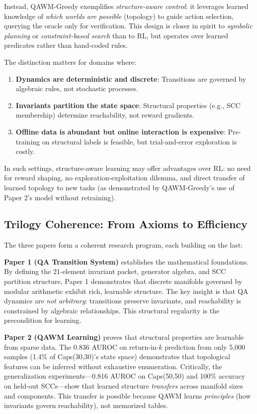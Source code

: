 Instead, QAWM-Greedy exemplifies \textit{structure-aware control}: it leverages learned knowledge of \textit{which worlds are possible} (topology) to guide action selection, querying the oracle only for verification. This design is closer in spirit to \textit{symbolic planning} or \textit{constraint-based search} than to RL, but operates over learned predicates rather than hand-coded rules.

The distinction matters for domains where:
\begin{enumerate}
\item \textbf{Dynamics are deterministic and discrete}: Transitions are governed by algebraic rules, not stochastic processes.
\item \textbf{Invariants partition the state space}: Structural properties (e.g., SCC membership) determine reachability, not reward gradients.
\item \textbf{Offline data is abundant but online interaction is expensive}: Pre-training on structural labels is feasible, but trial-and-error exploration is costly.
\end{enumerate}

In such settings, structure-aware learning may offer advantages over RL: no need for reward shaping, no exploration-exploitation dilemma, and direct transfer of learned topology to new tasks (as demonstrated by QAWM-Greedy's use of Paper 2's model without retraining).

\subsection{Trilogy Coherence: From Axioms to Efficiency}

The three papers form a coherent research program, each building on the last:

\textbf{Paper 1 (QA Transition System)} establishes the mathematical foundations. By defining the 21-element invariant packet, generator algebra, and SCC partition structure, Paper 1 demonstrates that discrete manifolds governed by modular arithmetic exhibit rich, learnable structure. The key insight is that QA dynamics are \textit{not arbitrary}: transitions preserve invariants, and reachability is constrained by algebraic relationships. This structural regularity is the precondition for learning.

\textbf{Paper 2 (QAWM Learning)} proves that structural properties are learnable from sparse data. The 0.836 AUROC on return-in-$k$ prediction from only 5,000 samples (1.4\% of Caps(30,30)'s state space) demonstrates that topological features can be inferred without exhaustive enumeration. Critically, the generalization experiments—0.816 AUROC on Caps(50,50) and 100\% accuracy on held-out SCCs—show that learned structure \textit{transfers} across manifold sizes and components. This transfer is possible because QAWM learns \textit{principles} (how invariants govern reachability), not memorized tables.

